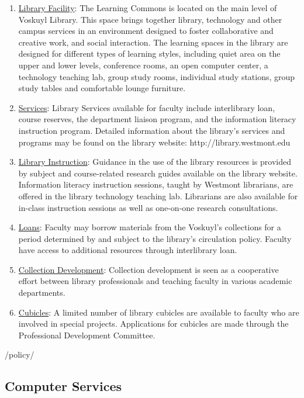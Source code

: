 		\begin{enumerate}[label=\alph*)]
			\item{\underline{Library Facility}:  The Learning Commons is located on the main level of Voskuyl Library.  This space brings together library, technology and other campus services in an environment designed to foster collaborative and creative work, and social interaction.  The learning spaces in the library are designed for different types of learning styles, including quiet area on the upper and lower levels, conference rooms, an open computer center, a technology teaching lab, group study rooms, individual study stations, group study tables and comfortable lounge furniture.
			}
			\item{\underline{Services}:  Library Services available for faculty include interlibrary loan, course reserves, the department liaison program, and the information literacy instruction program.  Detailed information about the library's services and programs may be found on the library website: http://library.westmont.edu
			}
			\item{\underline{Library Instruction}:  Guidance in the use of the library resources is provided by subject and course-related research guides available on the library website.  Information literacy instruction sessions, taught by Westmont librarians, are offered in the library technology teaching lab.  Librarians are also available for in-class instruction sessions as well as one-on-one research consultations.
			}
			\item{\underline{Loans}:  Faculty may borrow materials from the Voskuyl's collections for a period determined by and subject to the library's circulation policy.  Faculty have access to additional resources through interlibrary loan.
			}
			\item{\underline{Collection Development}:  Collection development is seen as a cooperative effort between library professionals and teaching faculty in various academic departments.
			}
			\item{\underline{Cubicles}:  A limited number of library cubicles are available to faculty who are involved in special projects.  Applications for cubicles are made through the Professional Development Committee.
			}
		\end{enumerate}/policy/

	\subsection{Computer Services}

